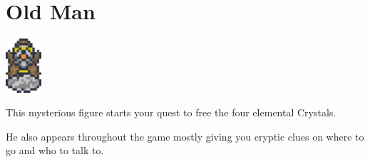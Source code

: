 \section{Old Man}
\label{char:old_man}

\includegraphics[height=2cm,keepaspectratio]{./resources/chars/old_man}

This mysterious figure starts your quest to free the four elemental Crystals.

He also appears throughout the game mostly giving you cryptic clues on where to go and who to talk to.
